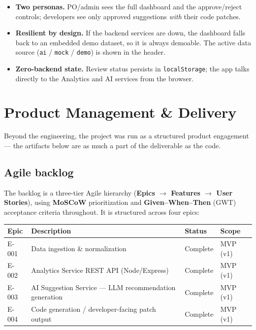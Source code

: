 \documentclass[11pt,a4paper]{article}
\begin{document}
\begin{itemize}[leftmargin=1.4em]
  \item \textbf{Two personas.} PO/admin sees the full dashboard and the
  approve/reject controls; developers see only approved suggestions \emph{with}
  their code patches.
  \item \textbf{Resilient by design.} If the backend services are down, the
  dashboard falls back to an embedded demo dataset, so it is always demoable.
  The active data source (\texttt{ai} / \texttt{mock} / \texttt{demo}) is shown
  in the header.
  \item \textbf{Zero-backend state.} Review status persists in
  \texttt{localStorage}; the app talks directly to the Analytics and AI
  services from the browser.
\end{itemize}

\section{Product Management \& Delivery}

Beyond the engineering, the project was run as a structured product engagement
--- the artifacts below are as much a part of the deliverable as the code.

\subsection{Agile backlog}

The backlog is a three-tier Agile hierarchy (\textbf{Epics $\rightarrow$
Features $\rightarrow$ User Stories}), using \textbf{MoSCoW} prioritization and
\textbf{Given--When--Then} (GWT) acceptance criteria throughout. It is
structured across four epics:

\begin{center}
\begin{tabularx}{\textwidth}{@{}l Y l l@{}}
\toprule
\textbf{Epic} & \textbf{Description} & \textbf{Status} & \textbf{Scope}\\
\midrule
E-001 & Data ingestion \& normalization & Complete & MVP (v1)\\
E-002 & Analytics Service REST API (Node/Express) & Complete & MVP (v1)\\
E-003 & AI Suggestion Service --- LLM recommendation generation & Complete & MVP (v1)\\
E-004 & Code generation / developer-facing patch output & Complete & MVP (v1)\\
\bottomrule
\end{tabularx}
\end{center}
\end{document}

